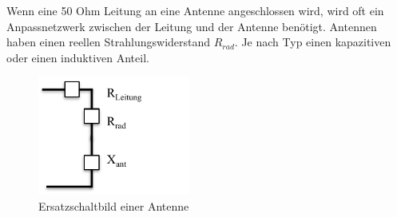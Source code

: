 Wenn eine 50 Ohm Leitung an eine Antenne angeschlossen wird,  wird oft ein Anpassnetzwerk zwischen der Leitung und der Antenne benötigt.  Antennen haben einen  reellen Strahlungswiderstand $R_{rad}$. Je nach Typ einen kapazitiven oder einen induktiven Anteil. \\
\begin{figure}[!htb]
	\centering
	\includegraphics[width=5cm]{content/bilder/ESB_Antenne.pdf}%
	\caption{Ersatzschaltbild einer Antenne}
	\label{ESBantenne}
\end{figure}


